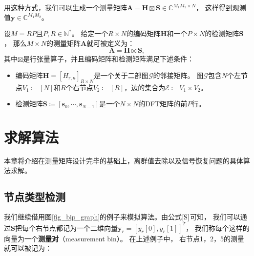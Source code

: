 \documentclass[AutoFakeBold]{LZUThesis}
\begin{document}
用这种方式，我们可以生成一个测量矩阵$\mathbf{A} = \mathbf{H} \boxtimes \mathbf{S} \in \mathbb{C}^{M_1 M_2 \times N}$，
这样得到观测值$\mathbf{y} \in \mathbb{C}^{M_1 M_2}$。
\begin{definition}[测量矩阵]
    设$M = RP$且$P, R \in \mathbb{N}^*$。
    给定一个$R \times N$的编码矩阵$\mathbf{H}$和一个$P \times N$的检测矩阵$\mathbf{S}$，
    那么$M \times N$的测量矩阵$\mathbf{A}$就可被定义为：
    \begin{equation}
        \mathbf{A} = \mathbf{H} \boxtimes \mathbf{S},
    \end{equation}
    其中$\boxtimes$是行张量算子，并且编码矩阵和检测矩阵满足下述条件：
    \begin{itemize}
        \item 编码矩阵$\mathbf{H} = [H_{r, n}]_{R \times N}$是一个关于二部图$\mathcal{G}$的邻接矩阵。
        图$\mathcal{G}$包含$N$个左节点$V_1 \coloneq [N]$和$R$个右节点$V_2 \coloneq [R]$，边的集合为$\mathcal{E} \coloneq V_1 \times V_2$。
        \item 检测矩阵$\mathbf{S} \coloneq \left[\mathbf{s}_0, \cdots, \mathbf{s}_{N-1}\right]$是一个$N \times N$的DFT矩阵的前$P$行。
    \end{itemize}
\end{definition}

\chapter{求解算法}

本章将介绍在测量矩阵设计完毕的基础上，离群值去除以及信号恢复问题的具体算法求解。

\section{节点类型检测}

我们继续借用图\ref{fig_bip_graph}的例子来模拟算法。由公式$\ref{S}$可知，
我们可以通过$\mathbf{S}$把每个右节点都记为一个二维向量$\mathbf{y}_r = [y_r[0], y_r[1]]^T$，
我们称每个这样的向量为一个\textbf{测量对}（measurement bin）。
在上述例子中，
右节点1，2，5的测量就可以被记为：
\end{document}
